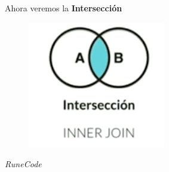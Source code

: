 \documentclass{article}
\begin{document}
Ahora veremos la \textbf{Intersección}\\
\begin{figure}[h!]
  \centering
  \includegraphics[scale=0.75]{./Pictures/096_Interseccion.png}
\end{figure}







\vspace{2cm}
\LARGE\textit{RuneCode}
\end{document}

